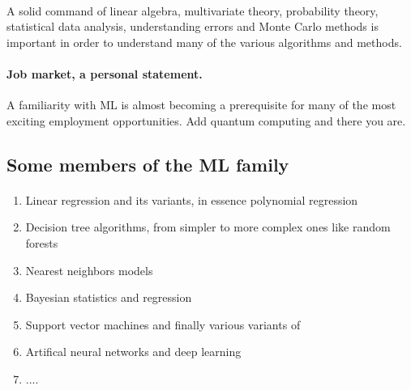 \documentclass[%
oneside,                 %
final,                   %
10pt]{article}
\begin{document}
\paragraph{}
A solid command of linear algebra, multivariate theory, 
probability theory, statistical data analysis,
understanding errors and Monte Carlo methods is important in order to understand many of the 
various algorithms and methods.




\paragraph{\textbf{Job market, a personal statement}.}
A familiarity with ML is almost becoming a prerequisite for many of the most exciting employment 
opportunities. Add quantum computing and there you are.



\subsection{Some members of the ML family}


\paragraph{}
\begin{enumerate}
\item Linear regression and its variants, in essence polynomial regression

\item Decision tree algorithms, from simpler to more complex ones like random forests

\item Nearest neighbors models

\item Bayesian statistics and regression

\item Support vector machines and finally various variants of

\item Artifical neural networks and deep learning

\item ....
\end{enumerate}

\noindent
\end{document}
